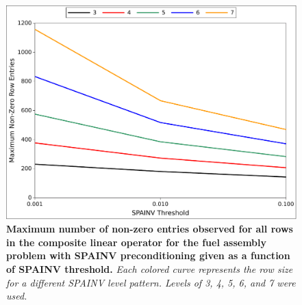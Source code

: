 \begin{figure}[t!]
  \begin{center}
    \includegraphics[width=6in]{chapters/spn_equations/spainv_size.pdf}
  \end{center}
  \caption{\textbf{Maximum number of non-zero entries observed for all
      rows in the composite linear operator for the fuel assembly
      problem with SPAINV preconditioning given as a function of
      SPAINV threshold.} \textit{Each colored curve represents the row
      size for a different SPAINV level pattern. Levels of 3, 4, 5, 6,
      and 7 were used.}}
  \label{fig:spainv_size}
\end{figure}

